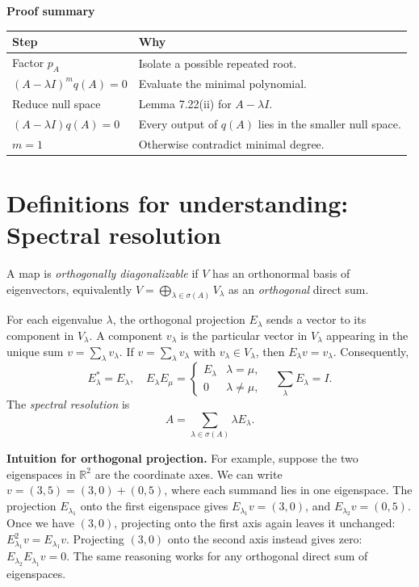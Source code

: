 \documentclass[11pt,a4paper]{article}
\newcommand{\prooftable}[1]{\medskip\textbf{Proof summary}\par\smallskip #1\medskip}
\begin{document}
\prooftable{\begin{tabularx}{\linewidth}{@{}p{.28\linewidth}X@{}}\hline
Step & Why\\\hline
Factor \(p_A\) & Isolate a possible repeated root.\\
\((A-\lambda I)^m q(A)=0\) & Evaluate the minimal polynomial.\\
Reduce null space & Lemma 7.22(ii) for \(A-\lambda I\).\\
\((A-\lambda I)q(A)=0\) & Every output of \(q(A)\) lies in the smaller null space.\\
\(m=1\) & Otherwise contradict minimal degree.\\\hline
\end{tabularx}}

\section*{Definitions for understanding: Spectral resolution}
A map is \emph{orthogonally diagonalizable} if \(V\) has an orthonormal basis of eigenvectors, equivalently
\(V=\bigoplus_{\lambda\in\sigma(A)}V_\lambda\) as an \emph{orthogonal} direct sum.

For each eigenvalue \(\lambda\), the orthogonal projection \(E_\lambda\) sends a vector to its component in \(V_\lambda\).
A component \(v_\lambda\) is the particular vector in \(V_\lambda\) appearing in the unique sum \(v=\sum_\lambda v_\lambda\). If \(v=\sum_\lambda v_\lambda\) with \(v_\lambda\in V_\lambda\), then
\(E_\lambda v=v_\lambda\). Consequently,
\[
E_\lambda^*=E_\lambda,\quad
E_\lambda E_\mu=\begin{cases}E_\lambda&\lambda=\mu,\\0&\lambda\neq\mu,\end{cases}
\quad \sum_\lambda E_\lambda=I.
\]
The \emph{spectral resolution} is
\[
A=\sum_{\lambda\in\sigma(A)}\lambda E_\lambda.
\]
\begin{personalnote}
\textbf{Intuition for orthogonal projection.}
For example, suppose the two eigenspaces in \(\mathbb R^2\) are the coordinate axes. We can write \(v=(3,5)=(3,0)+(0,5)\), where each summand lies in one eigenspace. The projection \(E_{\lambda_1}\) onto the first eigenspace gives \(E_{\lambda_1}v=(3,0)\), and \(E_{\lambda_2}v=(0,5)\). Once we have \((3,0)\), projecting onto the first axis again leaves it unchanged: \(E_{\lambda_1}^2v=E_{\lambda_1}v\). Projecting \((3,0)\) onto the second axis instead gives zero: \(E_{\lambda_2}E_{\lambda_1}v=0\). The same reasoning works for any orthogonal direct sum of eigenspaces.
\end{personalnote}
\end{document}

